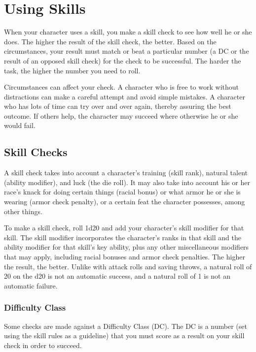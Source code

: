 \section{Using Skills}
When your character uses a skill, you make a skill check to see how well he or she does. The higher the result of the skill check, the better. Based on the circumstances, your result must match or beat a particular number (a DC or the result of an opposed skill check) for the check to be successful. The harder the task, the higher the number you need to roll.

Circumstances can affect your check. A character who is free to work without distractions can make a careful attempt and avoid simple mistakes. A character who has lots of time can try over and over again, thereby assuring the best outcome. If others help, the character may succeed where otherwise he or she would fail.

\subsection{Skill Checks}
A skill check takes into account a character's training (skill rank), natural talent (ability modifier), and luck (the die roll). It may also take into account his or her race's knack for doing certain things (racial bonus) or what armor he or she is wearing (armor check penalty), or a certain feat the character possesses, among other things.

To make a skill check, roll 1d20 and add your character's skill modifier for that skill. The skill modifier incorporates the character's ranks in that skill and the ability modifier for that skill's key ability, plus any other miscellaneous modifiers that may apply, including racial bonuses and armor check penalties. The higher the result, the better. Unlike with attack rolls and saving throws, a natural roll of 20 on the d20 is not an automatic success, and a natural roll of 1 is not an automatic failure.

\subsubsection{Difficulty Class}
Some checks are made against a Difficulty Class (DC). The DC is a number (set using the skill rules as a guideline) that you must score as a result on your skill check in order to succeed.

